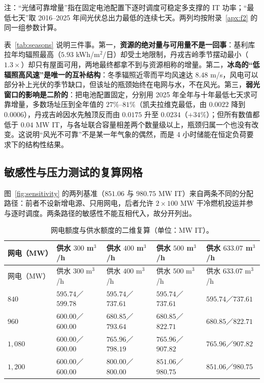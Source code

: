 \noindent 注：“光储可靠增量”指在固定电池配置下逐时调度可稳定多支撑的 IT 功率；“最低七天”取 2016–2025 年间光伏总出力最低的连续七天。两列均按附录~\ref{apx:f2} 的同一组参数计算。

表~\ref{tab:seasons} 说明三件事。第一，\textbf{资源的绝对量与可用量不是一回事}：基利库拉年均辐照最高（$5.93$ kWh/m$^2$/日）却受土地限制，丹戎吉岭季节摆动最小（$1.3\times$）却只有屋面可用，两地最终都拿不到与资源相称的增量。第二，\textbf{冰岛的“低辐照高风速”是唯一的互补结构}：冬季辐照近零而平均风速达 $8.48$ m/s，风电可以部分补上光伏的季节缺口，但该址的瓶颈始终在电网与水，不在风光。第三，\textbf{弱光窗口的影响是二阶的}：把电池配置固定，分别用 2025 年全年与十年最低七天求可靠增量，多数场址压到全年值的 $27\%$–$81\%$（凯夫拉维克最低，由 $0.0022$ 降到 $0.0006$），丹戎吉岭因水先触顶反而由 $0.0175$ 升至 $0.0234$（$+34\%$）；但所有数值都低于 $0.04$ MW IT，与各址联合容量相差两个数量级以上，瓶颈归属一个也没有改变。这说明“风光不可靠”不是某一年气象的偶然，而是 4 小时储能在恒定负荷要求下的结构性结果。

\subsection{敏感性与压力测试的复算网格}\label{apx:f4}

图~\ref{fig:sensitivity} 的两列基准（$851.06$ 与 $980.75$ MW IT）来自两条不同的分配路径：前者不设新增电源、只用网电，后者允许 $2\times100$ MW 干冷燃机投运并参与逐时调度。两条路径的敏感性不能互相代入，故分开列出。

{\footnotesize
\begin{longtable}{@{}>{\raggedright\arraybackslash}p{}>{\raggedright\arraybackslash}p{}>{\raggedright\arraybackslash}p{}>{\raggedright\arraybackslash}p{}>{\raggedright\arraybackslash}p{}@{}}
\caption{网电额度与供水额度的二维复算（单位：MW IT）。}\label{tab:grid}\\
\toprule
网电（MW） & 供水 $300$ m$^3$/h & 供水 $400$ m$^3$/h & 供水 $500$ m$^3$/h & 供水 $633.07$ m$^3$/h \\
\midrule
\endfirsthead
\toprule
网电（MW） & 供水 $300$ m$^3$/h & 供水 $400$ m$^3$/h & 供水 $500$ m$^3$/h & 供水 $633.07$ m$^3$/h \\
\midrule
\endhead
\bottomrule
\endlastfoot
$840$ & $595.74$／$599.78$ & $595.74$／$737.61$ & $595.74$／$737.61$ & $595.74$／$737.61$ \\
$960$ & $600.00$／$600.00$ & $680.85$／$793.64$ & $680.85$／$822.71$ & $680.85$／$822.71$ \\
$1{,}080$ & $600.00$／$600.00$ & $765.96$／$798.19$ & $765.96$／$907.82$ & $765.96$／$907.82$ \\
$1{,}200$ & $600.00$／$600.00$ & $800.00$／$800.00$ & $851.06$／$980.75$ & $851.06$／$980.75$ \\
\end{longtable}
}

